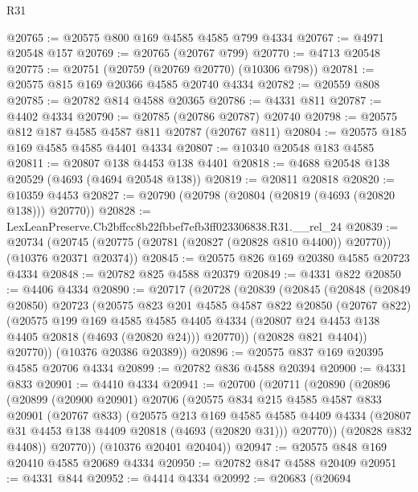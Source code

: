 \begin{lexlean}{R31}
\begin{coremodule}
@20765 := @20575 @800 @169 @4585 @4585 @799 @4334
@20767 := @4971 @20548 @157
@20769 := @20765 (@20767 @799)
@20770 := @4713 @20548
@20775 := @20751 (@20759 (@20769 @20770) (@10306 @798))
@20781 := @20575 @815 @169 @20366 @4585 @20740 @4334
@20782 := @20559 @808
@20785 := @20782 @814 @4588 @20365
@20786 := @4331 @811
@20787 := @4402 @4334
@20790 := @20785 (@20786 @20787) @20740
@20798 := @20575 @812 @187 @4585 @4587 @811 @20787 (@20767 @811)
@20804 := @20575 @185 @169 @4585 @4585 @4401 @4334
@20807 := @10340 @20548 @183 @4585
@20811 := @20807 @138 @4453 @138 @4401
@20818 := @4688 @20548 @138 @20529 (@4693 (@4694 @20548 @138))
@20819 := @20811 @20818
@20820 := @10359 @4453
@20827 := @20790 (@20798 (@20804 (@20819 (@4693 (@20820 @138))) @20770))
@20828 := LexLeanPreserve.Cb2bffcc8b22fbbef7efb3ff023306838.R31.__rel_24
@20839 := @20734
    (@20745 (@20775 (@20781 (@20827 (@20828 @810 @4400)) @20770)) (@10376 @20371 @20374))
@20845 := @20575 @826 @169 @20380 @4585 @20723 @4334
@20848 := @20782 @825 @4588 @20379
@20849 := @4331 @822
@20850 := @4406 @4334
@20890 := @20717
    (@20728
      (@20839
        (@20845
          (@20848
            (@20849 @20850)
            @20723
            (@20575
              @823
              @201
              @4585
              @4587
              @822
              @20850
              (@20767 @822)
              (@20575
                @199
                @169
                @4585
                @4585
                @4405
                @4334
                (@20807 @24 @4453 @138 @4405 @20818 (@4693 (@20820 @24)))
                @20770))
            (@20828 @821 @4404))
          @20770))
      (@10376 @20386 @20389))
@20896 := @20575 @837 @169 @20395 @4585 @20706 @4334
@20899 := @20782 @836 @4588 @20394
@20900 := @4331 @833
@20901 := @4410 @4334
@20941 := @20700
    (@20711
      (@20890
        (@20896
          (@20899
            (@20900 @20901)
            @20706
            (@20575
              @834
              @215
              @4585
              @4587
              @833
              @20901
              (@20767 @833)
              (@20575
                @213
                @169
                @4585
                @4585
                @4409
                @4334
                (@20807 @31 @4453 @138 @4409 @20818 (@4693 (@20820 @31)))
                @20770))
            (@20828 @832 @4408))
          @20770))
      (@10376 @20401 @20404))
@20947 := @20575 @848 @169 @20410 @4585 @20689 @4334
@20950 := @20782 @847 @4588 @20409
@20951 := @4331 @844
@20952 := @4414 @4334
@20992 := @20683
    (@20694

\end{coremodule}
\end{lexlean}
